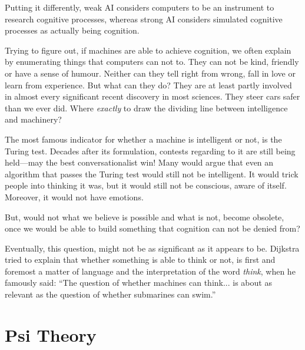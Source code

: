 Putting it differently, weak AI considers computers to be an instrument to research cognitive processes, whereas strong AI considers simulated cognitive processes as actually being cognition.


Trying to figure out, if machines are able to achieve cognition, we often explain by enumerating things that computers can not to. They can not be kind, friendly or have a sense of humour. Neither can they tell right from wrong, fall in love or learn from experience. But what can they do? They are at least partly involved in almost every significant recent discovery in most sciences. They steer cars safer than we ever did. Where \emph{exactly} to draw the dividing line between intelligence and machinery?~\cite{russell2009artificial}

The most famous indicator for whether a machine is intelligent or not, is the Turing test. Decades after its formulation, contests regarding to it are still being held---may the best conversationalist win! Many would argue that even an algorithm that passes the Turing test would still not be intelligent. It would trick people into thinking it was, but it would still not be conscious, aware of itself. Moreover, it would not have emotions.~\cite{russell2009artificial}

But, would not what we believe is possible and what is not, become obsolete, once we would be able to build something that cognition can not be denied from? 

Eventually, this question, might not be as significant as it appears to be. Dijkstra tried to explain that whether something is able to think or not, is first and foremost a matter of language and the interpretation of the word \emph{think}, when he famously said: ``The question of whether machines can think... is about as relevant as the question of whether submarines can swim.''

    \section{Psi Theory}
    
    
